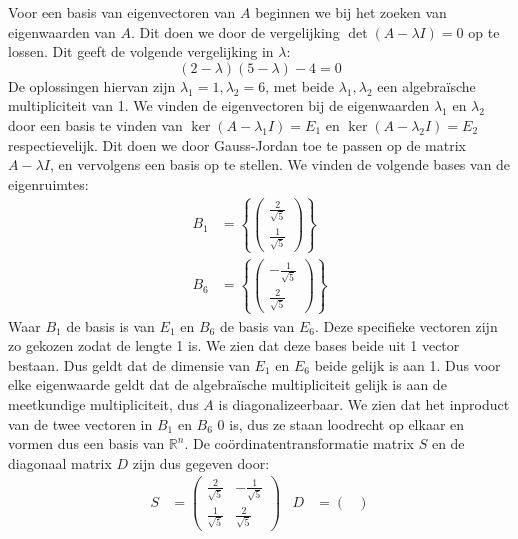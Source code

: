 \documentclass[12pt, dutch, a4paper]{article}
\theoremstyle{definition}
\begin{document}
\begin{enumerate}
    Voor een basis van eigenvectoren van $A$ beginnen we bij het zoeken van eigenwaarden van $A$. Dit doen we door de vergelijking $\det(A - \lambda I) = 0$ op te lossen. Dit geeft de volgende vergelijking in $\lambda$:
    \begin{equation}
        (2 - \lambda)(5 - \lambda) -4 = 0
    \end{equation}
    De oplossingen hiervan zijn $\lambda_1 = 1, \lambda_2 = 6$, met beide $\lambda_1, \lambda_2$ een algebraïsche multipliciteit van 1. We vinden de eigenvectoren bij de eigenwaarden $\lambda_1$ en  $\lambda_2$ door een basis te vinden van $\ker (A - \lambda_1 I) = E_1$ en $\ker (A - \lambda_2 I) = E_2$ respectievelijk. Dit doen we door Gauss-Jordan toe te passen op de matrix $A - \lambda I$, en vervolgens een basis op te stellen. We vinden de volgende bases van de eigenruimtes:
    \begin{align}
        B_1 &= \left\{ 
            \begin{pmatrix}
            \frac{2}{\sqrt{5}} \\
            \frac{1}{\sqrt{5}}
            \end{pmatrix}\right\}
        \\
        B_6 &= \left\{ 
            \begin{pmatrix}
            -\frac{1}{\sqrt{5}} \\
            \frac{2}{\sqrt{5}}
            \end{pmatrix}\right\}
    \end{align}
    Waar $B_1$ de basis is van $E_1$ en $B_6$ de basis van $E_6$. Deze specifieke vectoren zijn zo gekozen zodat de lengte 1 is. We zien dat deze bases beide uit 1 vector bestaan. Dus geldt dat de dimensie van $E_1$ en $E_6$ beide gelijk is aan 1. Dus voor elke eigenwaarde geldt dat de algebraïsche multipliciteit gelijk is aan de meetkundige multipliciteit, dus $A$ is diagonalizeerbaar. We zien dat het inproduct van de twee vectoren in $B_1$ en $B_6$ 0 is, dus ze staan loodrecht op elkaar en vormen dus een basis van $\mathbb{R}^n$. De coördinatentransformatie matrix $S$ en de diagonaal matrix $D$ zijn dus gegeven door:
    \begin{align}
        S &= 
        \begin{pmatrix}
            \frac{2}{\sqrt{5}} & -\frac{1}{\sqrt{5}} \\
            \frac{1}{\sqrt{5}} & \frac{2}{\sqrt{5}}
        \end{pmatrix} &
        D &= 
        \begin{pmatrix}

\end{pmatrix}
\end{align}
\end{enumerate}
\end{document}
